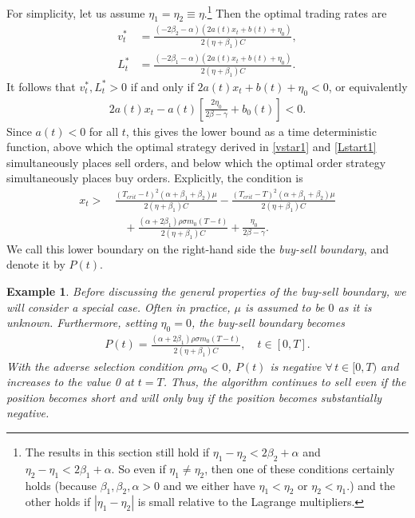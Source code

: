 \documentclass[12pt, letterpaper]{article}
\newtheorem{example}[theorem]{Example}
\numberwithin{equation}{section}
\numberwithin{theorem}{section}
\begin{document}
For simplicity, let us assume   $\eta_1=\eta_2\equiv\eta$.\footnote{The results in this section still hold if $\eta_1-\eta_2<2\beta_2+\alpha$ and $\eta_2-\eta_1<2\beta_1+\alpha$. So even if $\eta_1\neq\eta_2$, then one of these conditions certainly holds (because $\beta_1,\beta_2,\alpha>0$ and we either have $\eta_1<\eta_2$ or $\eta_2<\eta_1$.) and the other holds if $|\eta_1-\eta_2|$ is small relative to the Lagrange multipliers.} Then the optimal trading rates are
\begin{align} 
v_t^*&=\frac{\left(-2\beta_2-\alpha\right) (2a(t)x_t+b(t)+\eta_0)}{2(\eta+\beta_1)C},\label{vstar1}\\
L_t^*&=\frac{\left(-2\beta_1-\alpha\right) (2a(t)x_t+b(t)+\eta_0)}{2(\eta+\beta_1)C}.\label{Lstart1}
\end{align}
It follows that $v_t^*, L_t^*>0$ if and only if $2a(t)x_t+b(t)+\eta_0<0$, or equivalently
\begin{equation*}
\begin{aligned} 
2a(t)x_t-a(t)\left[\frac{2\eta_0}{2\beta-\gamma}+b_0(t)\right]<0.
\end{aligned}
\end{equation*}
Since $a(t)<0$ for all $t$, this gives the  lower bound as a  time deterministic function, above which the optimal  strategy derived in \eqref{vstar1} and \eqref{Lstart1} simultaneously places sell orders, and below which the optimal order strategy simultaneously places buy orders. Explicitly, the condition is
\begin{equation*}
\begin{aligned} 
x_t>&\, \frac{(T_{crit}-t)^2(\alpha+\beta_1+\beta_2)\mu}{2(\eta+\beta_1)C}-\frac{(T_{crit}-T)^2(\alpha+\beta_1+\beta_2)\mu}{2(\eta+\beta_1)C}\\
&\quad +\frac{(\alpha+2\beta_1)\rho\sigma m_0(T-t)}{2(\eta+\beta_1)C}+\frac{\eta_0}{2\beta-\gamma}.
\end{aligned}
\end{equation*}
We call this lower boundary on the right-hand side the \textit{buy-sell boundary}, and denote it by $P(t)$. 
\begin{example}\label{ex:inpracticeBSB}
Before discussing the general properties of the buy-sell boundary, we will consider a special case. Often in practice, $\mu$ is assumed to be $0$ as it is unknown. Furthermore, setting $\eta_0=0$, the buy-sell boundary becomes
\begin{equation*}
\begin{aligned} 
P(t)=\frac{(\alpha+2\beta_1)\rho\sigma m_0(T-t)}{2(\eta+\beta_1)C},\quad  t\in[0,T].
\end{aligned}
\end{equation*}
With the adverse selection condition $\rho m_0<0$, $P(t)$ is negative $\forall\, t\in[0,T)$ and increases to the value 0 at $t=T$. Thus, the algorithm continues to sell even if the position becomes short and will only buy if the position becomes substantially negative.
\end{example}
\end{document}
